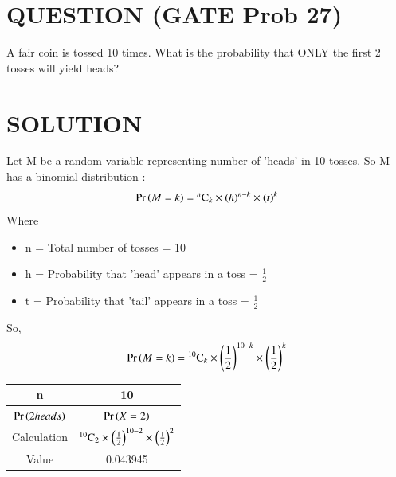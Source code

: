 \documentclass[journal,12pt,twocolumn]{IEEEtran}
\begin{document}
\section*{QUESTION (GATE Prob 27)}
A fair coin is tossed 10 times. What is the \newline probability that ONLY the first 2 tosses will yield heads?
\section*{SOLUTION}
Let M be a random variable representing number of 'heads' in 10 tosses.
\newline
So M has a binomial distribution :
\begin{align}
    \Pr\left(M=k\right) = {}^{n}\mathrm{C}_{k} \times (h)^{n-k} \times (t)^{k}\label{0.0.1}
\end{align}
Where
\begin{itemize}
    \item n = Total number of tosses = 10
    \item h = Probability that 'head' appears in a toss = \( \frac{1}{2} \)
    \item t = Probability that 'tail' appears in a toss = \( \frac{1}{2} \)
\end{itemize}
\bigskip
So,
\begin{align}
    \Pr\left(M=k\right) = {}^{10}\mathrm{C}_{k} \times \left(\frac{1}{2}\right)^{10-k} \times \left(\frac{1}{2}\right)^{k}\label{0.0.2}
\end{align}
\begin{table}[h]
    \begin{center}
        \resizebox{7cm}{!}
        {
            \begin{tabular}{|c|c|}
                \hline
                n           & 10                                                                            \\
                \hline
                $\Pr\left(2 heads\right)$  & $\Pr\left(X = 2\right)$                                                                    \\
                \hline
                Calculation & ${}^{10}\mathrm{C}_{2} \times \left(\frac{1}{2}\right)^{10-2} \times \left(\frac{1}{2}\right)^{2}$ \\
                \hline
                Value       & 0.043945                                                                      \\
                \hline
            \end{tabular}
        }
    \end{center}
\end{table}
\end{document}
